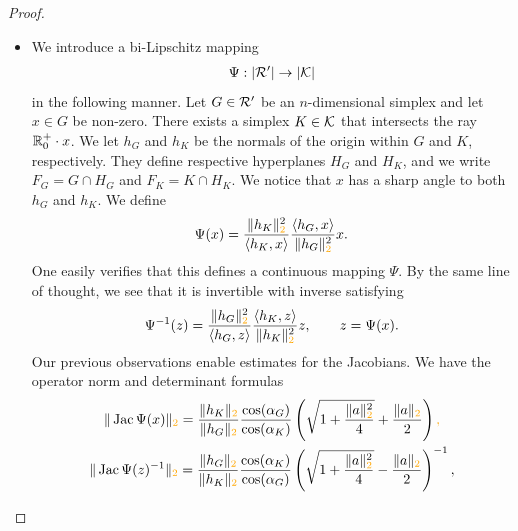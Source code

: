 \documentclass[10pt,letterpaper]{article}
\newcommand\cye[1]{%
  \protect\leavevmode
  \begingroup
    \color{red!35!yellow}%
    #1%
  \endgroup
}
\begin{document}
\begin{proof}
\begin{itemize}
        \item 
        We introduce a bi-Lipschitz mapping 
        \begin{align*}
            \Psi : |{\mathcal R}'| \rightarrow |{\mathcal K}|
        \end{align*}
        in the following manner. Let ${G} \in {\mathcal R}'$ be an $n$-dimensional simplex and let $x \in {G}$ be non-zero. There exists a simplex $K \in {\mathcal K}$ that intersects the ray ${\mathbb R}_0^+ \cdot x$. We let $h_{{G}}$ and $h_{K}$ be the normals of the origin within ${G}$ and $K$, respectively. They define respective hyperplanes $H_{G}$ and $H_{K}$,
        and we write $F_{G} = G \cap H_{G}$ and $F_{K} = K \cap H_{K}$. 
        We notice that $x$ has a sharp angle to both $h_{{G}}$ and $h_{K}$. 
        We define 
        \begin{align*}
            \Psi(x) 
            = 
            \frac{ \| h_K \|_{\cye{2}}^{2} }{ \langle h_K, x \rangle }
            \frac{ \langle h_{{G}}, x \rangle }{ \| h_{{G}} \|_{\cye{2}}^{2} }
            x
            .
        \end{align*}
        One easily verifies that this defines a continuous mapping $\Psi$. 
        By the same line of thought, we see that it is invertible with inverse satisfying 
        \begin{align*}
            \Psi^{-1}(z) 
            = 
            \frac{ \| h_{{G}} \|_{\cye{2}}^{2} }{ \langle h_{{G}}, z \rangle }
            \frac{ \langle h_K, z \rangle }{ \| h_K \|_{\cye{2}}^{2} }
            z,
            \qquad 
            z = \Psi(x)
            .
        \end{align*}
        Our previous observations enable estimates for the Jacobians. 
        We have the operator norm and determinant formulas 
        \begin{gather*}
            \| \Jacobian\Psi(x) \|_{\cye{2}}
            = 
            \frac{ \| h_K \|_{\cye{2}} }{ \| h_{{G}} \|_{\cye{2}} }
            \frac{ \cos(\alpha_{{G}}) }{ \cos(\alpha_K) }
            \left( 
                \sqrt{ 1 + \frac{ \|a\|_{\cye{2}}^{2} }{ 4 } } + \frac{ \|a\|_{\cye{2}} }{2}
            \right)\cye{,}
            \\
            \| \Jacobian\Psi(z)^{-1} \|_{\cye{2}}
            = 
            \frac{ \| h_{{G}} \|_{\cye{2}} }{ \| h_K \|_{\cye{2}} }
            \frac{ \cos(\alpha_K) }{ \cos(\alpha_{{G}}) }
            \left( 
                \sqrt{ 1 + \frac{ \|a\|_{\cye{2}}^{2} }{ 4 } } - \frac{ \|a\|_{\cye{2}} }{2}
            \right)^{-1},
            \\

\end{gather*}
\end{itemize}
\end{proof}
\end{document}
